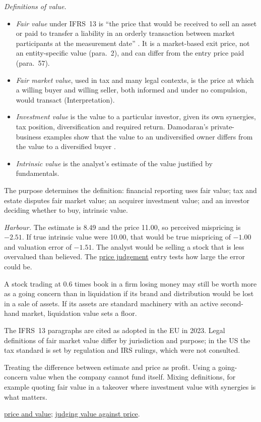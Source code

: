 \begin{qfdefinition}
\emph{Definitions of value.}
\begin{itemize}
\item \emph{Fair value} under IFRS~13 is ``the price that would be received to sell an asset or paid to transfer a liability in an orderly transaction between market participants at the measurement date'' \citep[IFRS~13 para.~9]{eu-2023-1803-ifrs13}. It is a market-based exit price, not an entity-specific value (para.~2), and can differ from the entry price paid (para.~57).
\item \emph{Fair market value}, used in tax and many legal contexts, is the price at which a willing buyer and willing seller, both informed and under no compulsion, would transact (Interpretation).
\item \emph{Investment value} is the value to a particular investor, given its own synergies, tax position, diversification and required return. Damodaran's private-business examples show that the value to an undiversified owner differs from the value to a diversified buyer \citep[pp.~556--557]{applied-corporate-finance-2014}.
\item \emph{Intrinsic value} is the analyst's estimate of the value justified by fundamentals.
\end{itemize}
The purpose determines the definition: financial reporting uses fair value; tax and estate disputes fair market value; an acquirer investment value; and an investor deciding whether to buy, intrinsic value.

 \emph{Harbour.} The estimate is 8.49 and the price 11.00, so perceived mispricing is $-2.51$. If true intrinsic value were 10.00, that would be true mispricing of $-1.00$ and valuation error of $-1.51$. The analyst would be selling a stock that is less overvalued than believed. The \hyperref[meth:valuation-price-judgement]{price judgement} entry tests how large the error could be.

A stock trading at 0.6 times book in a firm losing money may still be worth more as a going concern than in liquidation if its brand and distribution would be lost in a sale of assets. If its assets are standard machinery with an active second-hand market, liquidation value sets a floor.

 The IFRS~13 paragraphs are cited as adopted in the EU in 2023. Legal definitions of fair market value differ by jurisdiction and purpose; in the US the tax standard is set by regulation and IRS rulings, which were not consulted.

 Treating the difference between estimate and price as profit. Using a going-concern value when the company cannot fund itself. Mixing definitions, for example quoting fair value in a takeover where investment value with synergies is what matters.

 \hyperref[def:price-value-indicators]{price and value}; \hyperref[meth:valuation-price-judgement]{judging value against price}.

\end{qfdefinition}

